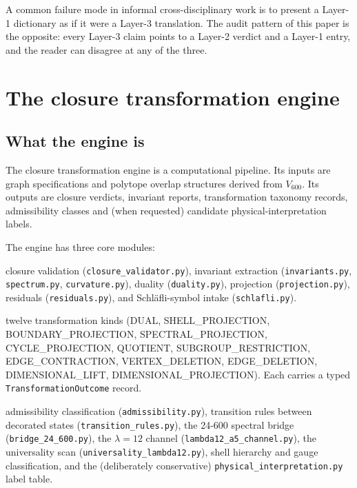 \documentclass[11pt,a4paper]{article}
\newcommand{\Vsix}{V_{600}}
\begin{document}
A common failure mode in informal cross-disciplinary work is to
present a Layer-1 dictionary as if it were a Layer-3 translation.
The audit pattern of this paper is the opposite: every Layer-3
claim points to a Layer-2 verdict and a Layer-1 entry, and the
reader can disagree at any of the three.

\section{The closure transformation engine}
\label{sec:engine}

\subsection{What the engine is}

The closure transformation engine \cite{transformationEngine} is a
computational pipeline. Its inputs are graph specifications and
polytope overlap structures derived from $\Vsix$. Its outputs are
closure verdicts, invariant reports, transformation taxonomy
records, admissibility classes and (when requested) candidate
physical-interpretation labels.

The engine has three core modules:

\begin{description}[leftmargin=*]
  \item[\texttt{core/}] closure validation
        (\texttt{closure\_validator.py}), invariant extraction
        (\texttt{invariants.py}, \texttt{spectrum.py},
        \texttt{curvature.py}), duality
        (\texttt{duality.py}), projection
        (\texttt{projection.py}), residuals
        (\texttt{residuals.py}), and Schl\"afli-symbol intake
        (\texttt{schlafli.py}).
  \item[\texttt{transformations/}] twelve transformation kinds
        (DUAL, SHELL\_PROJECTION, BOUNDARY\_PROJECTION,
        SPECTRAL\_PROJECTION, CYCLE\_PROJECTION, QUOTIENT,
        SUBGROUP\_RESTRICTION, EDGE\_CONTRACTION,
        VERTEX\_DELETION, EDGE\_DELETION, DIMENSIONAL\_LIFT,
        DIMENSIONAL\_PROJECTION). Each carries a typed
        \texttt{TransformationOutcome} record.
  \item[\texttt{physics/}] admissibility classification
        (\texttt{admissibility.py}), transition rules between
        decorated states (\texttt{transition\_rules.py}), the
        24-600 spectral bridge (\texttt{bridge\_24\_600.py}), the
        $\lambda = 12$ channel
        (\texttt{lambda12\_a5\_channel.py}), the universality scan
        (\texttt{universality\_lambda12.py}), shell hierarchy and
        gauge classification, and the (deliberately conservative)
        \texttt{physical\_interpretation.py} label table.
\end{description}
\end{document}
